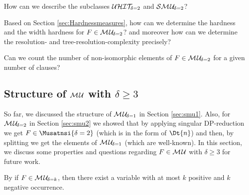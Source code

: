 \documentclass{report}
\begin{document}
\begin{quest}\label{que:mu2-uhit2}
How can we describe the subclasses $\mathcal{U}\mathcal{HIT}_{\!\!\delta=2}$ and $\mathcal{S}\mathcal{M\hspace{0.8pt}U}_{\!\delta=2}$?
\end{quest}

\begin{quest}\label{que:mu2-hardness}
Based on Section \ref{sec:Hardnessmeasures}, how can we determine the hardness and the width hardness for $F \in \mathcal{M\hspace{0.8pt}U}_{\!\delta=2}$? and moreover how can we determine the resolution- and tree-resolution-complexity precisely?
\end{quest}

\begin{quest}\label{que:mu2-count}
Can we count the number of non-isomorphic elements of $F \in \mathcal{M\hspace{0.8pt}U}_{\!\delta=2}$ for a given number of clauses?
\end{quest}

\subsection{Structure of $\mathcal{M\hspace{0.8pt}U}$ with $\delta \ge 3$}
\label{sec:smu3}

So far, we discussed the structure of $\mathcal{M\hspace{0.8pt}U}_{\!\delta=1}$ in Section \ref{sec:smu1}. Also, for $\mathcal{M\hspace{0.8pt}U}_{\!\delta=2}$ in Section \ref{sec:smu2} we showed that by applying singular DP-reduction we get $F \in \Musatnsi{\delta=2}$ (which is in the form of $\Dt{n} $) and then, by splitting we get the elements of $\mathcal{M\hspace{0.8pt}U}_{\!\delta=1}$ (which are well-known). In this section, we discuss some properties and questions regarding $F \in \mathcal{M\hspace{0.8pt}U}$ with $\delta \ge 3$ for future work.
\begin{lem}\label{lem:muk-k}
By \cite{Ku99dK} if $F \in \mathcal{M\hspace{0.8pt}U}_{\!\delta=k}$, then there exist a variable with at most $k$ positive and $k$ negative occurrence. %
\end{lem}
\end{document}
